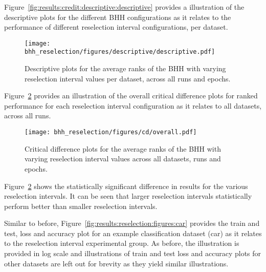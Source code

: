 Figure~\ref{fig:results:credit:descriptive:descriptive} provides a illustration of the descriptive plots for the different \acs{BHH} configurations as it relates to the performance of different reselection interval configurations, per dataset.

\begin{figure}[H]
	\centering
	\texttt{[image: bhh\_reselection/figures/descriptive/descriptive.pdf]}
	\caption{Descriptive plots for the average ranks of the \acs{BHH} with varying reselection interval values per dataset, across all runs and epochs.}
	\label{fig:results:reselection:descriptive:descriptive}
\end{figure}

Figure~\ref{fig:results:reselection:descriptive:cd} provides an illustration of the overall critical difference plots for ranked performance for each reselection interval configuration as it relates to all datasets, across all runs.

\begin{figure}[H]
	\centering
	\texttt{[image: bhh\_reselection/figures/cd/overall.pdf]}
	\caption{Critical difference plots for the average ranks of the \acs{BHH} with varying reselection interval values across all datasets, runs and epochs.}
	\label{fig:results:reselection:descriptive:cd}
\end{figure}

Figure~\ref{fig:results:reselection:descriptive:cd} shows the statistically significant difference in results for the various reselection intervals. It can be seen that larger reselection intervals statistically perform better than smaller reselection intervals.

Similar to before, Figure~\ref{fig:results:reselection:figures:car} provides the train and test, loss and accuracy plot for an example classification dataset (car) as it relates to the reselection interval experimental group. As before, the illustration is provided in log scale and illustrations of train and test loss and accuracy plots for other datasets are left out for brevity as they yield similar illustrations.

